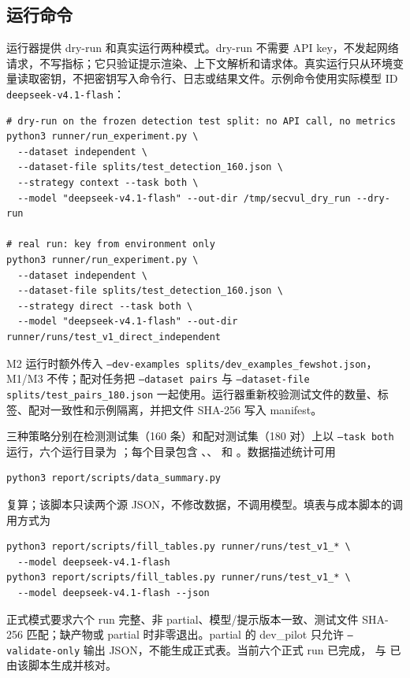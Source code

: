 \documentclass[conference]{IEEEtran}
\begin{document}
\subsection{运行命令}
运行器提供 dry-run 和真实运行两种模式。dry-run 不需要 API key，不发起网络请求，不写指标；它只验证提示渲染、上下文解析和请求体。真实运行只从环境变量读取密钥，不把密钥写入命令行、日志或结果文件。示例命令使用实际模型 ID \texttt{deepseek-v4.1-flash}：

\begin{lstlisting}
# dry-run on the frozen detection test split: no API call, no metrics
python3 runner/run_experiment.py \
  --dataset independent \
  --dataset-file splits/test_detection_160.json \
  --strategy context --task both \
  --model "deepseek-v4.1-flash" --out-dir /tmp/secvul_dry_run --dry-run

# real run: key from environment only
python3 runner/run_experiment.py \
  --dataset independent \
  --dataset-file splits/test_detection_160.json \
  --strategy direct --task both \
  --model "deepseek-v4.1-flash" --out-dir runner/runs/test_v1_direct_independent
\end{lstlisting}
M2 运行时额外传入 \texttt{--dev-examples splits/dev\_examples\_fewshot.json}，M1/M3 不传；配对任务把 \texttt{--dataset pairs} 与 \texttt{--dataset-file splits/test\_pairs\_180.json} 一起使用。运行器重新校验测试文件的数量、标签、配对一致性和示例隔离，并把文件 SHA-256 写入 manifest。

三种策略分别在检测测试集（160 条）和配对测试集（180 对）上以 \texttt{--task both} 运行，六个运行目录为 ；每个目录包含 、、 和 。数据描述统计可用
\begin{lstlisting}
python3 report/scripts/data_summary.py
\end{lstlisting}
复算；该脚本只读两个源 JSON，不修改数据，不调用模型。填表与成本脚本的调用方式为
\begin{lstlisting}
python3 report/scripts/fill_tables.py runner/runs/test_v1_* \
  --model deepseek-v4.1-flash
python3 report/scripts/fill_tables.py runner/runs/test_v1_* \
  --model deepseek-v4.1-flash --json
\end{lstlisting}
正式模式要求六个 run 完整、非 partial、模型/提示版本一致、测试文件 SHA-256 匹配；缺产物或 partial 时非零退出。partial 的 dev\_pilot 只允许 \texttt{--validate-only} 输出 JSON，不能生成正式表。当前六个正式 run 已完成， 与  已由该脚本生成并核对。
\end{document}
